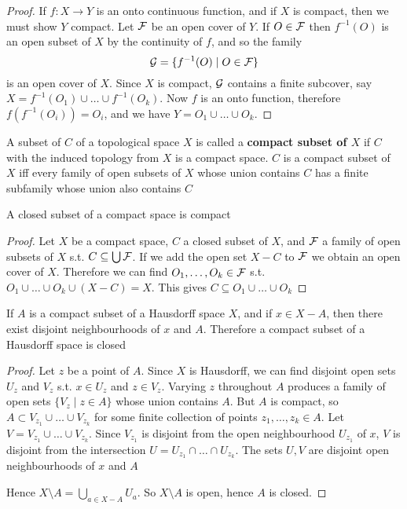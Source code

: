 \documentclass[11pt]{article}
\begin{document}
\begin{proof}
If \(f:X\to Y\) is an onto continuous function, and if \(X\) is compact, then
we must show \(Y\) compact. Let \(\mathcal{F}\) be an open cover of \(Y\). If
\(O\in\mathcal{F}\) then \(f^{-1}(O)\) is an open subset of \(X\) by the continuity
of \(f\), and so the family
\begin{equation*}
\mathcal{G}=\{f^{-1}(O)\mid O\in\mathcal{F}\}
\end{equation*}
is an open cover of \(X\). Since \(X\) is compact, \(\mathcal{G}\) contains a
finite subcover, say \(X=f^{-1}(O_1)\cup\dots\cup f^{-1}(O_k)\). Now \(f\) is
an onto function, therefore \(f(f^{-1}(O_i))=O_i\), and we have
\(Y=O_1\cup\dots\cup O_k\).
\end{proof}

A subset of \(C\) of a topological space \(X\) is called a \textbf{compact subset of
\(X\)} if \(C\) with the induced topology from \(X\) is a compact space. \(C\)
is a compact subset of \(X\) iff every family of open subsets of \(X\) whose
union contains \(C\) has a finite subfamily whose union also contains \(C\)

\begin{theorem}[]
\label{thm3.5}
A closed subset of a compact space is compact
\end{theorem}

\begin{proof}
Let \(X\) be a compact space, \(C\) a closed subset of \(X\), and \(\mathcal{F}\) a
family of open subsets of \(X\) s.t. \(C\subseteq\bigcup\mathcal{F}\). If we add
the open set \(X-C\) to \(\mathcal{F}\) we obtain an open cover of \(X\). Therefore
we can find \(O_1,\dots,O_k\in\mathcal{F}\) s.t. \(O_1\cup\dots\cup
   O_k\cup(X-C)=X\). This gives \(C\subseteq O_1\cup\dots\cup O_k\)
\end{proof}

\begin{theorem}[]
\label{thm3.6}
If \(A\) is a compact subset of a Hausdorff space \(X\), and if \(x\in X-A\),
then there exist disjoint neighbourhoods of \(x\) and \(A\). Therefore a
compact subset of a Hausdorff space is closed
\end{theorem}

\begin{proof}
Let \(z\) be a point of \(A\). Since \(X\) is Hausdorff, we can find disjoint
open sets \(U_z\) and \(V_z\) s.t. \(x\in U_z\) and \(z\in V_z\). Varying
\(z\) throughout \(A\) produces a family of open sets \(\{V_z\mid z\in A\}\)
whose union contains \(A\). But \(A\) is compact, so \(A\subset
   V_{z_1}\cup\dots\cup V_{z_k}\) for some finite collection of points
\(z_1,\dots,z_k\in A\). Let \(V=V_{z_1}\cup\dots\cup V_{z_k}\). Since
\(V_{z_1}\) is disjoint from the open neighbourhood \(U_{z_1}\) of \(x\),
\(V\) is disjoint from the intersection \(U=U_{z_1}\cap\dots\cap U_{z_k}\).
The sets \(U,V\) are disjoint open neighbourhoods of \(x\) and \(A\)

Hence \(X\setminus A=\bigcup_{a\in X-A}U_a\). So \(X\setminus A\) is open,
hence \(A\) is closed.
\end{proof}
\end{document}
